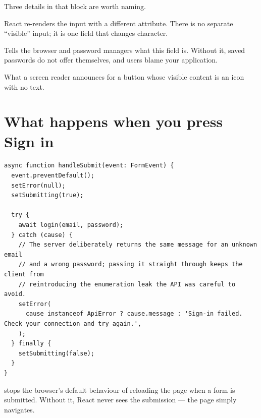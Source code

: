 Three details in that block are worth naming.

\begin{description}[leftmargin=1.2cm,style=nextline]
\item[\fpath{type=\{showPassword ? 'text' : 'password'\}}] React re-renders the
  input with a different  attribute. There is no separate ``visible''
  input; it is one field that changes character.
\item[\fpath{autoComplete="current-password"}] Tells the browser and password
  managers what this field is. Without it, saved passwords do not offer
  themselves, and users blame your application.
\item[\fpath{aria-label}] What a screen reader announces for a button whose
  visible content is an icon with no text.
\end{description}


\section{What happens when you press Sign in}

\begin{lstlisting}[language=tsx]
async function handleSubmit(event: FormEvent) {
  event.preventDefault();
  setError(null);
  setSubmitting(true);

  try {
    await login(email, password);
  } catch (cause) {
    // The server deliberately returns the same message for an unknown email
    // and a wrong password; passing it straight through keeps the client from
    // reintroducing the enumeration leak the API was careful to avoid.
    setError(
      cause instanceof ApiError ? cause.message : 'Sign-in failed. Check your connection and try again.',
    );
  } finally {
    setSubmitting(false);
  }
}
\end{lstlisting}

 stops the browser's default behaviour of
reloading the page when a form is submitted. Without it, React never sees the
submission --- the page simply navigates.

